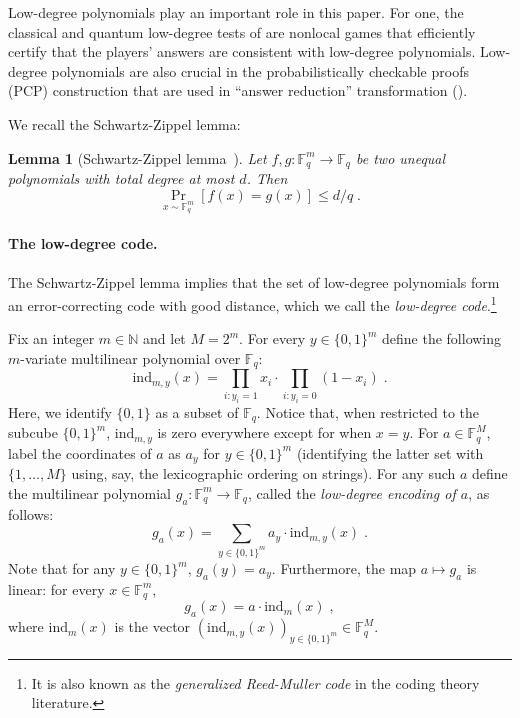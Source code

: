 \documentclass[11pt]{article}
\newtheorem{lemma}[theorem]{Lemma}
\theoremstyle{definition}
\newcommand{\N}{\ensuremath{\mathbb{N}}}
\newcommand{\F}{\ensuremath{\mathbb{F}}}
\newcommand{\ind}{\ensuremath{\mathrm{ind}}}
\begin{document}
Low-degree polynomials play an important role in this paper.
For one, the classical and quantum low-degree tests of  are
nonlocal games that efficiently certify that the players' answers are consistent
with low-degree polynomials.
Low-degree polynomials are also crucial in the probabilistically checkable
proofs (PCP) construction that are used in ``answer reduction'' transformation
().

We recall the Schwartz-Zippel lemma: 

\begin{lemma}[Schwartz-Zippel lemma~\cite{Sch80,Zip79}]
  \label{lem:schwartz-zippel}
  Let $f, g: \F_q^m \to \F_q$ be two unequal polynomials with total degree at most $d$. Then
  \begin{equation*}
    \Pr_{x \sim \F_q^m}[f(x) = g(x)] \leq d/q\;.
  \end{equation*}
\end{lemma}


\paragraph{The low-degree code.}
The Schwartz-Zippel lemma implies that the set of low-degree polynomials form an
error-correcting code with good distance, which we call the \emph{low-degree
  code}.\footnote{It is also known as the \emph{generalized Reed-Muller code} in
  the coding theory literature.}

Fix an integer $m \in \N$ and let $M = 2^m$.
For every $y \in \{0,1\}^m$ define the following $m$-variate multilinear
polynomial over $\F_q$:
\[
	\ind_{m,y}(x) = \prod_{i: y_i = 1} x_i \cdot \prod_{i: y_i = 0} (1 - x_i) \;.
\]
Here, we identify $\{0,1\}$ as a subset of $\F_q$.
Notice that, when restricted to the subcube $\{0,1\}^m$, $\ind_{m, y}$ is zero
everywhere except for when $x = y$.
For $a\in \F_q^M$, label the coordinates of $a$ as $a_y$ for $y\in \{0,1\}^m$
(identifying the latter set with $\{1,\ldots,M\}$ using, say, the lexicographic
ordering on strings).
For any such $a$ define the multilinear polynomial $g_a: \F_q^m \to \F_q$,
called the \emph{low-degree encoding of $a$}, as follows:
\begin{equation}
\label{eq:ld-encoding}
	 g_a(x) = \sum_{y \in \{0,1\}^m} a_y \cdot \ind_{m,y}(x)\;.
\end{equation}
Note that for any $y \in \{0,1\}^m$, $g_a(y) = a_y$.
Furthermore, the map $a\mapsto g_a$ is linear: for every $x \in \F_q^m$,
\begin{equation}
\label{eq:low-degree-encoding-definition}
	g_a(x) = a \cdot \ind_m(x)\;,
\end{equation}
where $\ind_m(x)$ is the vector $(\ind_{m,y}(x))_{y \in \{0,1\}^m}\in\F_q^M$.
\end{document}
